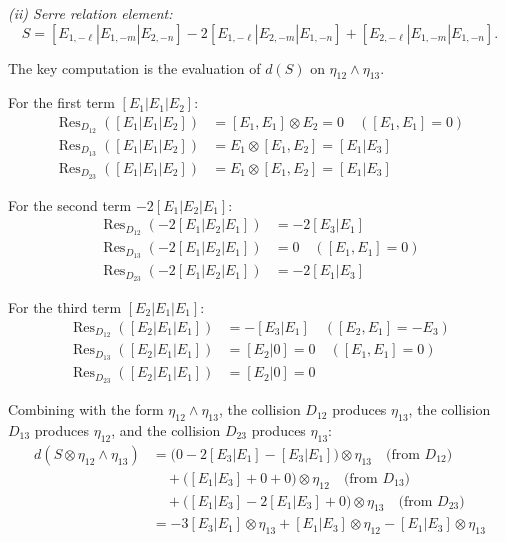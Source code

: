 \begin{computation}
\emph{(ii) Serre relation element:}
\[
S = [E_{1,-\ell}|E_{1,-m}|E_{2,-n}] -
2[E_{1,-\ell}|E_{2,-m}|E_{1,-n}] + [E_{2,-\ell}|E_{1,-m}|E_{1,-n}].
\]

The key computation is the evaluation of $d(S)$ on
$\eta_{12}\wedge\eta_{13}$.

For the first term $[E_1|E_1|E_2]$:
\begin{align*}
\operatorname{Res}_{D_{12}}([E_1|E_1|E_2]) &= [E_1, E_1] \otimes E_2
= 0 \quad ([E_1, E_1] = 0) \\
\operatorname{Res}_{D_{13}}([E_1|E_1|E_2]) &= E_1 \otimes [E_1, E_2]
= [E_1|E_3] \\
\operatorname{Res}_{D_{23}}([E_1|E_1|E_2]) &= E_1 \otimes [E_1, E_2]
= [E_1|E_3]
\end{align*}

For the second term $-2[E_1|E_2|E_1]$:
\begin{align*}
\operatorname{Res}_{D_{12}}(-2[E_1|E_2|E_1]) &= -2[E_3|E_1] \\
\operatorname{Res}_{D_{13}}(-2[E_1|E_2|E_1]) &= 0
\quad ([E_1, E_1] = 0) \\
\operatorname{Res}_{D_{23}}(-2[E_1|E_2|E_1]) &= -2[E_1|E_3]
\end{align*}

For the third term $[E_2|E_1|E_1]$:
\begin{align*}
\operatorname{Res}_{D_{12}}([E_2|E_1|E_1]) &= -[E_3|E_1]
\quad ([E_2, E_1] = -E_3) \\
\operatorname{Res}_{D_{13}}([E_2|E_1|E_1]) &= [E_2|0] = 0
\quad ([E_1, E_1] = 0) \\
\operatorname{Res}_{D_{23}}([E_2|E_1|E_1]) &= [E_2|0] = 0
\end{align*}

Combining with the form $\eta_{12}\wedge\eta_{13}$,
the collision $D_{12}$ produces $\eta_{13}$,
the collision $D_{13}$ produces $\eta_{12}$,
and the collision $D_{23}$ produces $\eta_{13}$:
\begin{align*}
d(S \otimes \eta_{12}\wedge\eta_{13})
&= \bigl(0 - 2[E_3|E_1] - [E_3|E_1]\bigr) \otimes \eta_{13}
\quad\text{(from $D_{12}$)} \\
&\quad + \bigl([E_1|E_3] + 0 + 0\bigr) \otimes \eta_{12}
\quad\text{(from $D_{13}$)} \\
&\quad + \bigl([E_1|E_3] - 2[E_1|E_3] + 0\bigr) \otimes \eta_{13}
\quad\text{(from $D_{23}$)} \\
&= -3[E_3|E_1]\otimes\eta_{13}
+ [E_1|E_3]\otimes\eta_{12}
- [E_1|E_3]\otimes\eta_{13}
\end{align*}


\end{computation}
